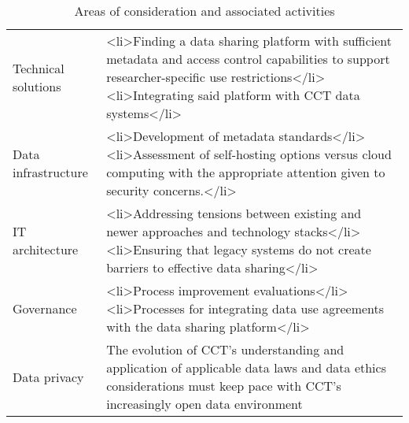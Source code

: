 % 

\begin{table}

\caption{\label{tab:}Areas of consideration and associated activities}
\centering
\begin{tabular}[t]{ll}
\toprule
Technical solutions & <li>Finding a data sharing platform with sufficient metadata and access control capabilities to support researcher-specific use restrictions</li><li>Integrating said platform with CCT data systems</li>\\
Data infrastructure & <li>Development of metadata standards</li><li>Assessment of self-hosting options versus cloud computing with the appropriate attention given to security concerns.</li>\\
IT architecture & <li>Addressing tensions between existing and newer approaches and technology stacks</li><li>Ensuring that legacy systems do not create barriers to effective data sharing</li>\\
Governance & <li>Process improvement evaluations</li><li>Processes for integrating data use agreements with the data sharing platform</li>\\
Data privacy & The evolution of CCT's understanding and application of applicable data laws and data ethics considerations must keep pace with CCT's increasingly open data environment\\
\bottomrule
\end{tabular}
\end{table}